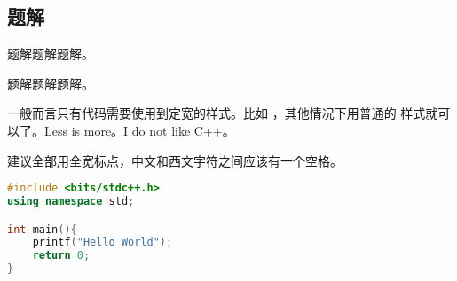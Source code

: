 \subsection{题解}
\begin{frame}
题解题解题解。
\end{frame}


\begin{frame}[fragile] %
题解题解题解。

一般而言只有代码需要使用到定宽的样式。比如 ，其他情况下用普通的
样式就可以了。Less is more。I do not like C++。

建议全部用全宽标点，中文和西文字符之间应该有一个空格。

\begin{lstlisting}[language=C++]
#include <bits/stdc++.h>
using namespace std;

int main(){
    printf("Hello World");
    return 0;
}
\end{lstlisting}
\end{frame}
